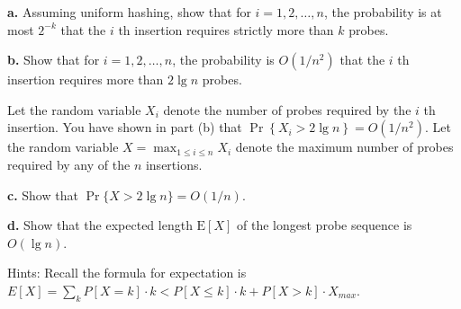 \documentclass[11pt]{exam}
\begin{document}
\textbf{a.} Assuming uniform hashing, show that for $i=1,2, \ldots, n$, the probability is at most $2^{-k}$ that the $i$ th insertion requires strictly more than $k$ probes.

\textbf{b.} Show that for $i=1,2, \ldots, n$, the probability is $O\left(1 / n^{2}\right)$ that the $i$ th insertion requires more than $2 \lg n$ probes.

Let the random variable $X_{i}$ denote the number of probes required by the $i$ th insertion. You have shown in part (b) that $\operatorname{Pr}\left\{X_{i}>2 \lg n\right\}=O\left(1 / n^{2}\right)$. Let the random variable $X=\max _{1 \leq i \leq n}
    X_{i}$ denote the maximum number of probes required by any of the $n$ insertions.

\textbf{c.} Show that $\operatorname{Pr}\{X>2 \lg n\}=O(1 / n)$.

\textbf{d.} Show that the expected length $\mathrm{E}[X]$ of the longest probe sequence is $O(\lg n)$. \par
Hints: Recall the formula for expectation is $E[X] = \sum_{k} P[X = k]\cdot k < P[X \leq k] \cdot k + P[X > k] \cdot X_{max}$.
\end{document}
